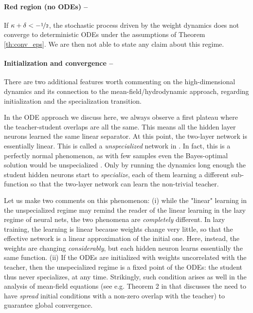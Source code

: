\documentclass[10pt]{article}
\begin{document}
\paragraph{Red region (no ODEs) --}
If $ \kappa + \delta < - \nicefrac{1}{2} $, the stochastic process driven by the weight dynamics does not converge to deterministic ODEs under the assumptions of Theorem \ref{th:conv_eps}. We are then not able to state any claim about this regime. 

\paragraph{Initialization and convergence --}
There are two additional features worth commenting on the high-dimensional dynamics and its connection to the mean-field/hydrodynamic approach, regarding initialization and the specialization transition. 

In the ODE approach we discuss here, we always observe a first plateau where the teacher-student overlaps are all the same. This means all the hidden layer neurons learned the same linear separator. At this point, the two-layer network is essentially linear. This is called a \emph{unspecialized} network in \cite{saad_1995_0,saad_1995}. In fact, this is a perfectly normal phenomenon, as with few samples even the Bayes-optimal solution would be unspecialized \cite{aubin2019committee}. Only by running the dynamics long enough the student hidden neurons start to \emph{specialize}, each of them learning a different sub-function so that the two-layer network can learn the non-trivial teacher.

Let us make two comments on this phenomenon: (i) while the "linear" learning in the unspecialized regime may remind the reader of the linear learning in the lazy regime \cite{jacot_2018,chizat_2019} of neural nets, the two phenomena are {\it completely} different. In  lazy training, the learning is linear because weights change very little, so that the effective network is a linear approximation of the initial one. Here, instead, the weights are changing {\it considerably}, but each hidden neuron learns essentially the same function.    
(ii) If the ODEs are initialized with weights uncorrelated with the teacher, then the unspecialized regime is a fixed point of the ODEs: the student thus never specializes, at any time. Strikingly, such condition arises as well in the analysis of mean-field equations (see e.g. Theorem 2 in \cite{bach2021gradient} that discusses the need to have \emph{spread} initial conditions with a non-zero overlap with the teacher) to guarantee global convergence. 
\end{document}
